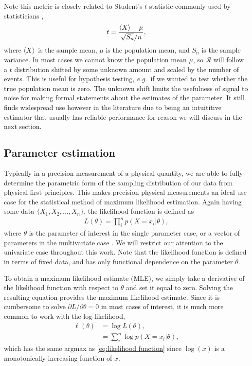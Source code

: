 Note this metric is closely related to Student's $t$ statistic commonly used by statisticians \cite{Casella2002},
\begin{align}
  t = \frac{\left\langle X \right\rangle - \mu}{\sqrt{S_n}/n},
\end{align}
where $\left\langle X \right\rangle$ is the sample mean, $\mu$ is the population mean, and $S_n$ is the sample variance.  In most cases we cannot know the population mean $\mu$, so $\mathcal{R}$ will follow a $t$ distribution shifted by some unknown amount and scaled by the number of events.  This is useful for hypothesis testing, \emph{e.g.~}if we wanted to test whether the true population mean is zero.  The unknown shift limits the usefulness of signal to noise for making formal statements about the estimates of the parameter.  It still finds widespread use however in the literature due to being an intuititive estimator that usually has reliable performance for reason we will discuss in the next section.  

\subsection{Parameter estimation}
Typically in a precision measurement of a physical quantity, we are able to fully determine the parametric form of the sampling distribution of our data from physical first principles.  This makes precision physical measurements an ideal use case for the statistical method of maximum likelihood estimation.  Again having some data $\{X_1, X_2,..., X_n\}$, the likelihood function is defined as
\begin{align}\label{eq:likelihood function}
  L(\theta) = \prod^n_i p(X=x_i|\theta),
\end{align}
where $\theta$ is the parameter of interest in the single parameter case, or a vector of parameters in the multivariate case \cite{Casella2002, Wasserman2004}.  We will restrict our attention to the univariate case throughout this work.  Note that the likelihood function is defined in terms of fixed data, and has only functional dependence on the parameter $\theta$.

To obtain a maximum likelihood estimate (MLE), we simply take a derivative of the likelihood function with respect to $\theta$ and set it equal to zero.  Solving the resulting equation provides the maximum likelihood estimate.  Since it is cumbersome to solve $\partial L/ \partial \theta = 0$ in most cases of interest, it is much more common to work with the log-likelihood,
\begin{align}
\nonumber  \ell(\theta) &= \log L(\theta), \\
                        &=  \sum^n_i  \log p(X=x_i|\theta),
\end{align}
which has the same argmax as \eqref{eq:likelihood function} since $\log(x)$ is a monotonically increasing function of $x$.

